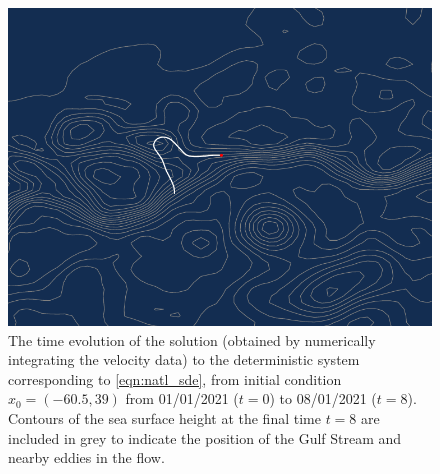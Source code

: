 \begin{figure}
	\begin{center}
		\includegraphics[width=\textwidth]{figures/gulf_stream_motivation/det_traj.pdf}
		\caption{The time evolution of the solution (obtained by numerically integrating the velocity data) to the deterministic system corresponding to \eqref{eqn:natl_sde}, from initial condition \(x_0 = \left(-60.5, 39\right)\) from 01/01/2021 (\(t = 0\)) to 08/01/2021 (\(t = 8\)).
			Contours of the sea surface height at the final time \(t = 8\) are included in grey to indicate the position of the Gulf Stream and nearby eddies in the flow.}
		\label{fig:na_motiv_det}
	\end{center}
\end{figure}



